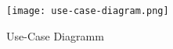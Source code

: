 \begin{figure}[H]
    \centering
    \texttt{[image: use-case-diagram.png]}
    \caption{Use-Case Diagramm}
    \label{fig:use-case-diagram}
\end{figure}


